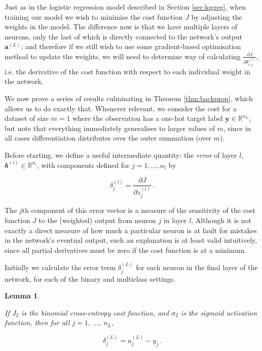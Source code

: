 \documentclass{article}[11pt]
\newtheorem{lemma}{Lemma}
\begin{document}
        Just as in the logistic regression model described in Section \ref{sec:logreg}, when training our model we wish to minimise the cost function $J$ by adjusting the weights in the model. The difference now is that we have multiple layers of neurons, only the last of which is directly connected to the network's output $\mathbf{a}^{(L)}$; and therefore if we still wish to use some gradient-based optimisation method to update the weights, we will need to determine way of calculating $\frac{\partial J}{\partial \theta^{(l)}_{i,j}}$, i.e. the derivative of the cost function with respect to each individual weight in the network.
        
        We now prove a series of results culminating in Theorem \ref{thm:backprop}, which allows us to do exactly that. Whenever relevant, we consider the cost for a dataset of size $m = 1$ where the observation has a one-hot target label $\mathbf{y} \in \mathbb{R}^{n_L}$; but note that everything immediately generalises to larger values of $m$, since in all cases differentiation distributes over the outer summation (over $m$).
        
        Before starting, we define a useful intermediate quantity: the \textit{error} of layer $l$, $\boldsymbol{\delta}^{(l)} \in \mathbb{R}^{n_l}$, with components defined for $j = 1, \ldots, n_l$ by
        
        $$
        \delta^{(l)}_j = \frac{\partial J}{\partial z^{(l)}_j} \,.
        $$
        
        The $j$th component of this error vector is a measure of the sensitivity of the cost function $J$ to the (weighted) output from neuron $j$ in layer $l$. Although it is not exactly a direct measure of how much a particular neuron is at fault for mistakes in the network's eventual output, such an explanation is at least valid intuitively, since all partial derivatives must be zero if the cost function is at a minimum.
        
        Initially we calculate the error term $\delta^{(L)}_j$ for each neuron in the final layer of the network, for each of the binary and multiclass settings.
        
        
        \begin{lemma} \label{thm:init_sigmoid}
            
            If $J_2$ is the binomial cross-entropy cost function, and $\sigma_2$ is the sigmoid activation function, then for all $j = 1, \ \ldots, \ n_L$,
            
            $$
            \delta^{(L)}_j = a^{(L)}_j - y_j \,.
            $$
            
        \end{lemma}
        
\end{document}
